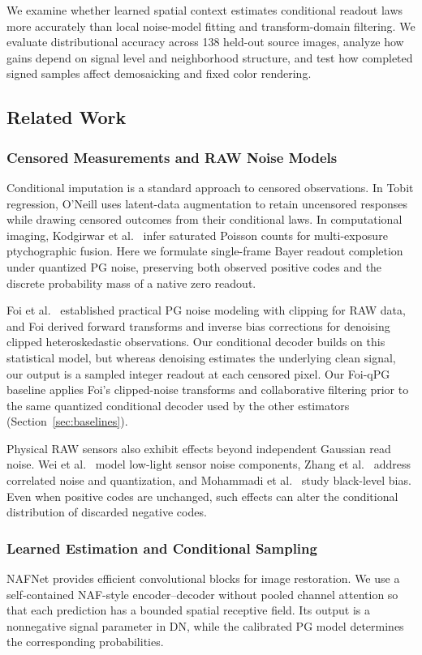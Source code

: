 \documentclass[10pt,twocolumn,journal]{IEEEtran}
\begin{document}
We examine whether learned spatial context estimates conditional readout laws more accurately than local noise-model fitting and transform-domain filtering. We evaluate distributional accuracy across 138 held-out source images, analyze how gains depend on signal level and neighborhood structure, and test how completed signed samples affect demosaicking and fixed color rendering.

\subsection{Related Work}
\subsubsection{Censored Measurements and RAW Noise Models}
Conditional imputation is a standard approach to censored observations. In Tobit regression, O'Neill \cite{oneill2024} uses latent-data augmentation to retain uncensored responses while drawing censored outcomes from their conditional laws. In computational imaging, Kodgirwar et al.\ \cite{kodgirwar2024} infer saturated Poisson counts for multi-exposure ptychographic fusion. Here we formulate single-frame Bayer readout completion under quantized PG noise, preserving both observed positive codes and the discrete probability mass of a native zero readout.

Foi et al.\ \cite{foi2008} established practical PG noise modeling with clipping for RAW data, and Foi \cite{foi2009} derived forward transforms and inverse bias corrections for denoising clipped heteroskedastic observations. Our conditional decoder builds on this statistical model, but whereas denoising estimates the underlying clean signal, our output is a sampled integer readout at each censored pixel. Our Foi-qPG baseline applies Foi's clipped-noise transforms and collaborative filtering prior to the same quantized conditional decoder used by the other estimators (Section~\ref{sec:baselines}).

Physical RAW sensors also exhibit effects beyond independent Gaussian read noise. Wei et al.\ \cite{wei2020} model low-light sensor noise components, Zhang et al.\ \cite{zhang2021} address correlated noise and quantization, and Mohammadi et al.\ \cite{mohammadi2026} study black-level bias. Even when positive codes are unchanged, such effects can alter the conditional distribution of discarded negative codes.

\subsubsection{Learned Estimation and Conditional Sampling}
NAFNet \cite{nafnet} provides efficient convolutional blocks for image restoration. We use a self-contained NAF-style encoder--decoder without pooled channel attention so that each prediction has a bounded spatial receptive field. Its output is a nonnegative signal parameter in DN, while the calibrated PG model determines the corresponding probabilities.
\end{document}
